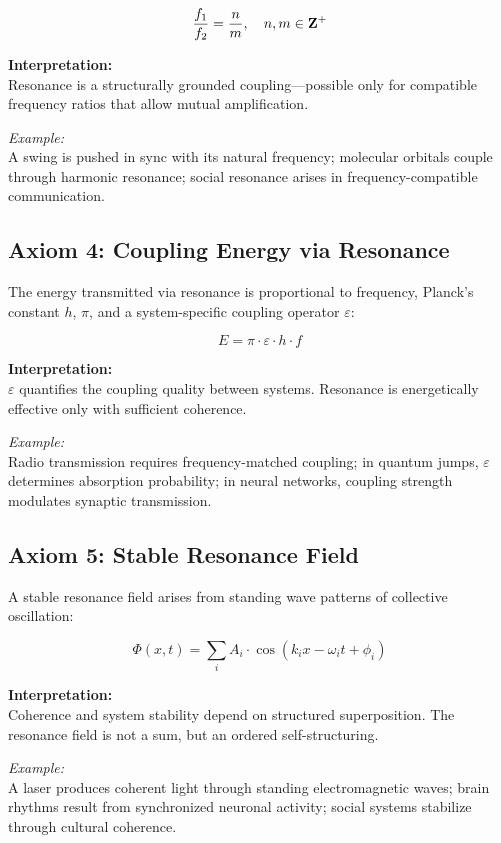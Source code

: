 \documentclass[12pt]{iopart}
\providecommand{\mathbb}[1]{\mathbf{#1}}
\providecommand{\quad}{\hskip1em\relax}
\begin{document}
$$
\frac{f_1}{f_2} = \frac{n}{m},\quad n, m \in \mathbb{Z}^+
$$

\textbf{Interpretation:}\\
Resonance is a structurally grounded coupling—possible only for compatible frequency ratios that allow mutual amplification.

\textit{Example:}\\
A swing is pushed in sync with its natural frequency; molecular orbitals couple through harmonic resonance; social resonance arises in frequency-compatible communication.

\subsection{Axiom 4: Coupling Energy via Resonance}

The energy transmitted via resonance is proportional to frequency, Planck’s constant $h$, $\pi$, and a system-specific coupling operator $\varepsilon$:

$$
E = \pi \cdot \varepsilon \cdot h \cdot f
$$

\textbf{Interpretation:}\\
$\varepsilon$ quantifies the coupling quality between systems. Resonance is energetically effective only with sufficient coherence.

\textit{Example:}\\
Radio transmission requires frequency-matched coupling; in quantum jumps, $\varepsilon$ determines absorption probability; in neural networks, coupling strength modulates synaptic transmission.

\subsection{Axiom 5: Stable Resonance Field}

A stable resonance field arises from standing wave patterns of collective oscillation:

$$
\Phi(x, t) = \sum_{i} A_i \cdot \cos(k_i x - \omega_i t + \phi_i)
$$

\textbf{Interpretation:}\\
Coherence and system stability depend on structured superposition. The resonance field is not a sum, but an ordered self-structuring.

\textit{Example:}\\
A laser produces coherent light through standing electromagnetic waves; brain rhythms result from synchronized neuronal activity; social systems stabilize through cultural coherence.
\end{document}

